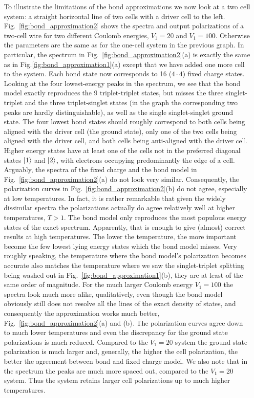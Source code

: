To illustrate the limitations of the bond approximations we now look at a two
cell system: a straight horizontal line of two cells with a driver cell to the
left. Fig.~\ref{fig:bond_approximation2} shows the spectra and output
polarizations of a two-cell wire for two different Coulomb energies, $V_1 = 20$
and $V_1 = 100$. Otherwise the parameters are the same as for the one-cell
system in the previous graph. In particular, the spectrum in
Fig.~\ref{fig:bond_approximation2}(a) is exactly the same as in
Fig.\ref{fig:bond_approximation1}(a) except that we have added one more cell to
the system. Each bond state now corresponds to 16 ($4 \cdot 4$) fixed charge
states. Looking at the four lowest-energy peaks in the spectrum, we see that the
bond model exactly reproduces the 9 triplet-triplet states, but misses the three
singlet-triplet and the three triplet-singlet states (in the graph the
corresponding two peaks are hardly distinguishable), as well as the single
singlet-singlet ground state. The four lowest bond states should roughly
correspond to both cells being aligned with the driver cell (the ground state),
only one of the two cells being aligned with the driver cell, and both cells
being anti-aligned with the driver cell. Higher energy states have at least one
of the cells not in the preferred diagonal states $\left|1\right>$ and $\left|2\right>$, with
electrons occupying predominantly the edge of a cell. Arguably, 
the spectra of the fixed charge and the bond model in
Fig.~\ref{fig:bond_approximation2}(a) do not look very similar. Consequently,
the polarization curves in Fig.~\ref{fig:bond_approximation2}(b) do not agree,
especially at low temperatures. In fact, it is rather remarkable that given the
widely dissimilar spectra the polarizations actually do agree relatively well at higher
temperatures, $T > 1$. The bond model only reproduces the most populous energy
states of the exact spectrum. Apparently, that is enough to give (almost)
correct results at high temperatures. The lower the temperature, the more
important become the few lowest lying energy states which the bond model misses.
Very roughly speaking, the temperature where the bond model's polarization
becomes accurate also matches the temperature where we saw the singlet-triplet
splitting being washed out in Fig.~\ref{fig:bond_approximation1}(b), they are at
least of the same order of magnitude. For the much larger Coulomb energy $V_1 =
100$ the spectra look much more alike, qualitatively, even though the bond model
obviously still does not resolve all the lines of the exact density of states,
and consequently the approximation works much better,
Fig.~\ref{fig:bond_approximation2}(a) and (b). The polarization curves agree down to
much lower temperatures and even the discrepancy for the ground state
polarizations is much reduced. Compared to the $V_1 = 20$ system the ground
state polarization is much larger and, generally, the higher the cell
polarization, the better the agreement between bond and fixed charge model. We
also note that in the spectrum the peaks are much more spaced out, compared to
the $V_1 = 20$ system. Thus the system retains larger cell polarizations up to
much higher temperatures.

